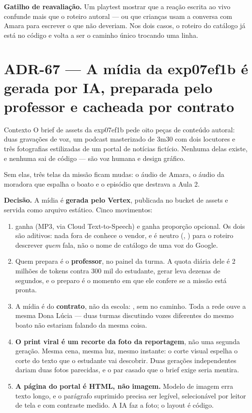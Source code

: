 \textbf{Gatilho de reavaliação.} Um playtest mostrar que a reação escrita ao
vivo confunde mais que o roteiro autoral --- ou que crianças usam a conversa com
Amara para escrever o que não deveriam. Nos dois casos, o roteiro do catálogo
já está no código e volta a ser o caminho único trocando uma linha.


\section{ADR-67 --- A mídia da exp07ef1b é gerada por IA, preparada pelo professor
e cacheada por contrato}
\label{adr:exp07ef1b-midia-gerada}

\begin{especificacao}{Contexto}
O brief de assets da exp07ef1b pede oito peças de conteúdo autoral: duas gravações
de voz, um podcast masterizado de 3m30 com dois locutores e três fotografias
estilizadas de um portal de notícias fictício. Nenhuma delas existe, e nenhuma
sai de código --- são voz humana e design gráfico.

Sem elas, três telas da missão ficam mudas: o áudio de Amara, o áudio da
moradora que espalha o boato e o episódio que destrava a Aula 2.
\end{especificacao}

\textbf{Decisão.} A mídia é \textbf{gerada pelo Vertex}, publicada no bucket de
assets e servida como arquivo estático. Cinco movimentos:

\begin{enumerate}
  \item {} ganha  (MP3, via Cloud
    Text-to-Speech) e  ganha proporção opcional. Os dois são
    aditivos: nada fora de  conhece o vendor, e  é
    neutro (, ) para o roteiro descrever
    \emph{quem} fala, não o nome de catálogo de uma voz do Google.
  \item Quem prepara é o \textbf{professor}, no painel da turma. A quota diária
    dele é 2 milhões de tokens contra 300 mil do estudante, gerar leva dezenas
    de segundos, e o preparo é o momento em que ele confere se a missão está
    pronta.
  \item A mídia é do \textbf{contrato}, não da escola:
    , sem  no caminho.
    Toda a rede ouve a mesma Dona Lúcia --- duas turmas discutindo vozes
    diferentes do mesmo boato não estariam falando da mesma coisa.
  \item \textbf{O print viral é um recorte da foto da reportagem}, não uma
    segunda geração. Mesma cena, mesma luz, mesmo instante: o corte visual
    espelha o corte do texto que o estudante vai descobrir. Duas gerações
    independentes dariam duas fotos parecidas, e o par casado que o brief exige
    seria mentira.
  \item \textbf{A página do portal é HTML, não imagem.} Modelo de imagem erra
    texto longo, e o parágrafo suprimido precisa ser legível, selecionável por
    leitor de tela e com contraste medido. A IA faz a foto; o layout é código.
\end{enumerate}

